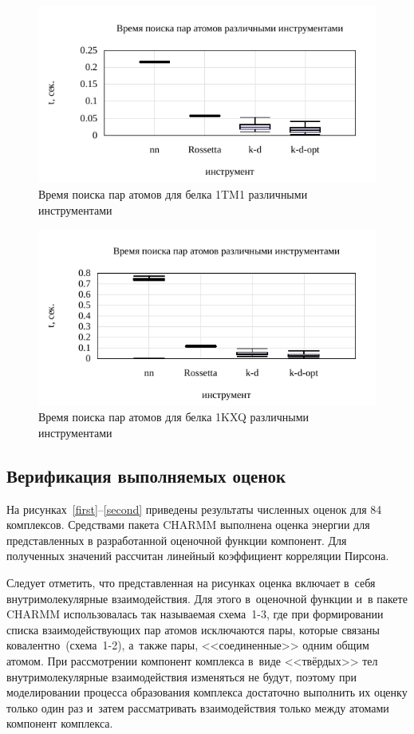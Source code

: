 \begin{figure}[h!]
	\centering
	\includegraphics[width=1.0\linewidth]{images/plotsvg.pdf}
	\caption{Время поиска пар атомов для белка 1TM1 различными инструментами}
	\label{1tm1}
\end{figure}

\begin{figure}[h!]
	\centering
	\includegraphics[width=1.0\linewidth]{images/plotsvg1.pdf}
	\caption{Время поиска пар атомов для белка 1KXQ различными инструментами}
	\label{1kxq}
\end{figure}


\subsection{Верификация выполняемых оценок}


На рисунках~\ref{first}--\ref{second} приведены результаты численных оценок для 84 комплексов. Средствами пакета CHARMM выполнена оценка энергии для представленных в разработанной оценочной функции компонент. Для полученных значений рассчитан линейный коэффициент корреляции Пирсона.

Следует отметить, что представленная на рисунках оценка включает в~себя внутримолекулярные взаимодействия. Для этого в~оценочной функции и~в пакете CHARMM использовалась так называемая схема~1-3, где при формировании списка взаимодействующих пар атомов исключаются пары, которые связаны ковалентно~(схема~1-2), а~также пары, <<соединенные>> одним общим атомом. При рассмотрении компонент комплекса в~виде <<твёрдых>> тел внутримолекулярные взаимодействия изменяться не будут, поэтому при моделировании процесса образования комплекса достаточно выполнить их оценку только один раз и~затем рассматривать взаимодействия только между атомами компонент комплекса.

